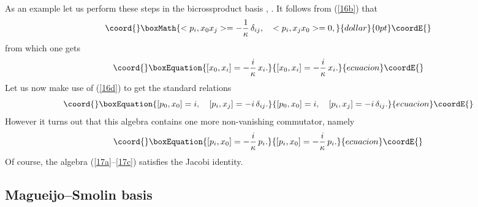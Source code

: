 \documentclass[a4paper,a4paper]{article}
\begin{document}
As an example let us perform these steps in the bicrossproduct basis \cite{maru}, \cite{crossalg}.
It follows from (\ref{16b}) that
$$\coord{}\boxMath{
<p_i, x_0 x_j> = -\frac1\kappa\, \delta_{ij}, \quad <p_i,  x_jx_0>=0,
}{dollar}{0pt}\coordE{}$$
from which one gets
\begin{equation}\coord{}\boxEquation{\label{17a}
[x_0, x_i] = -\frac{i}\kappa\, x_i.
}{[x_0, x_i] = -\frac{i}\kappa\, x_i.
}{ecuacion}\coordE{}\end{equation}
Let us now make use of (\ref{16d}) to get the standard relations
\begin{equation}\coord{}\boxEquation{\label{17b}
[p_0, x_0] = i, \quad [p_i, x_j] = -i \, \delta_{ij}.
}{[p_0, x_0] = i, \quad [p_i, x_j] = -i \, \delta_{ij}.
}{ecuacion}\coordE{}\end{equation}
However it turns out that this algebra contains one more
non-vanishing commutator, namely
\begin{equation}\coord{}\boxEquation{\label{17c}
 [p_i, x_0] = -\frac{i}\kappa\, p_i.
}{[p_i, x_0] = -\frac{i}\kappa\, p_i.
}{ecuacion}\coordE{}\end{equation}
Of course, the algebra (\ref{17a}--\ref{17c}) satisfies the Jacobi identity.


\subsection{Magueijo--Smolin basis}
\end{document}
